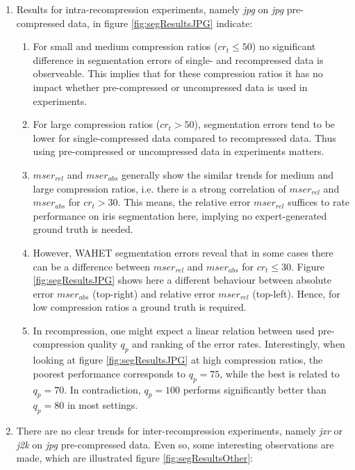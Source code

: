 \documentclass[10pt,twocolumn,letterpaper]{article}
\begin{document}
\begin{enumerate}
	\item Results for intra-recompression experiments, namely \emph{jpg} on \emph{jpg} pre-compressed data, in figure \ref{fig:segResultsJPG} indicate:  
	
	
	\begin{enumerate}
		\item For small and medium compression ratios ($ cr_t \leq 50 $) no significant difference in segmentation errors of single- and recompressed data is observeable. This implies that for these compression ratios it has no impact whether pre-compressed or uncompressed data is used in experiments. \label{noDiff}
		\item For large compression ratios ($cr_t > 50$), segmentation errors tend to be lower for single-compressed data compared to recompressed data. Thus using pre-compressed or uncompressed data in experiments matters. \label{yesDiff} 
		 
		 \item $mser_{rel}$ and $mser_{abs}$ generally show the similar trends for medium and large compression ratios, i.e. there is a strong correlation of  $mser_{rel}$ and $mser_{abs}$ for $cr_t > 30$. This means, the relative error $mser_{rel}$ suffices to rate performance on iris segmentation here, implying no expert-generated ground truth is needed. \label{gtNoHigh}
		 
		 \item However, WAHET segmentation errors reveal that in some cases there can be a difference between $mser_{rel}$ and $mser_{abs}$ for $cr_t \leq 30$. Figure \ref{fig:segResultsJPG} shows here a different behaviour between absolute error $mser_{abs}$ (top-right) and relative error $mser_{rel}$ (top-left). Hence, for low compression ratios a ground truth is required. \label{gtForLow}
		 
		 \item In recompression, one might expect a linear relation between used pre-compression quality $q_p$ and ranking of the error rates. Interestingly, when looking at figure \ref{fig:segResultsJPG} at high compression ratios, the poorest performance corresponds to $q_p=75$, while the best is related to $q_p=70$. In contradiction, $q_p=100$ performs significantly better than $q_p=80$ in most settings.   \label{qpConfusion}
	\end{enumerate}
 
 
 \item There are no clear trends for inter-recompression experiments, namely \emph{jxr} or \emph{j2k} on \emph{jpg} pre-compressed data. Even so, some interesting observations are made, which are illustrated figure \ref{fig:segResultsOther}:
 

\end{enumerate}
\end{document}
